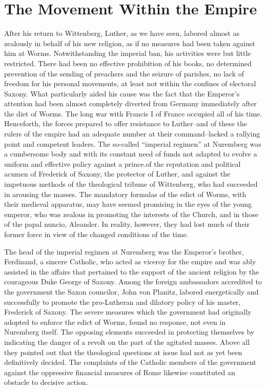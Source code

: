 \section{The Movement Within the Empire}

After his return to Wittenberg, Luther, as we have seen, labored
almost as zealously in behalf of his new religion, as if no measures
had been taken against him at Worms. Notwithstanding the imperial
ban, his activities were but little restricted. There had been no effective
prohibition of his books, no determined prevention of the
sending of preachers and the seizure of parishes, no lack of freedom
for his personal movements, at least not within the confines of
electoral Saxony. What particularly aided his cause was the fact
that the Emperor’s attention had been almost completely diverted
from Germany immediately after the diet of Worms. The long war
with Francis I of France occupied all of his time. Henceforth, the
forces prepared to offer resistance to Luther--and of these the rulers
of the empire had an adequate number at their command--lacked
a rallying point and competent leaders. The so-called “imperial
regimen” at Nuremberg was a cumbersome body and with its constant need
of funds not adapted to evolve a uniform and effective
policy against a prince.of the reputation and political acumen of
Frederick of Saxony, the protector of Luther, and against the impetuous
methods of the theological tribune of Wittenberg, who had
succeeded in arousing the masses. The mandatory formulas of the
edict of Worms, with their medieval apparatus, may have seemed
promising in the eyes of the young emperor, who was zealous in
promoting the interests of the Church, and in those of the papal
nuncio, Aleander. In reality, however, they had lost much of their
former force in view of the changed conditions of the time.

The head of the imperial regimen at Nuremberg was the Emperor’s
brother, Ferdinand, a sincere Catholic, who acted as viceroy for the
empire and was ably assisted in the affairs that pertained to the support
of the ancient religion by the courageous Duke George of
Saxony. Among the foreign ambassadors accredited to the government the
Saxon councilor, John von Planitz, labored energetically
and successfully to promote the pro-Lutheran and dilatory policy
of his master, Frederick of Saxony. The severe measures which
the government had originally adopted to enforce the edict of
Worms, found no response, not even in Nuremberg itself. The opposing elements
succeeded in protecting themselves by indicating the
danger of a revolt on the part of the agitated masses. Above all
they pointed out that the theological questions at issue had not as
yet been definitively decided. The complaints of the Catholic members of
the government against the oppressive financial measures
of Rome likewise constituted an obstacle to decisive action.

